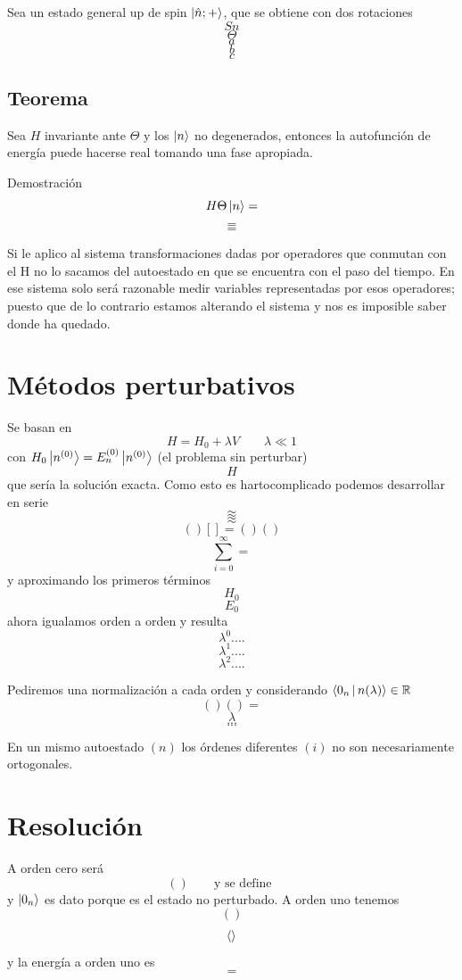 \documentclass[10pt,oneside]{CBFT_book}
\begin{document}
Sea un estado general up de spin $\Ket{\hat{n};+}$, que se obtiene con dos rotaciones 
\[
	Sn
\]
\[
	\Theta
\]
\[
	a
\]
\[
	b
\]
\[
	c
\]

\subsection{Teorema}

Sea $H$ invariante ante $\Theta$ y los $\Ket{n}$ no degenerados, entonces la autofunción de energía puede 
hacerse real tomando una fase apropiada.

Demostración 
\[
	H \Theta  \Ket{n} =
\]
\[
	=
\]
\[
	=
\]

Si le aplico al sistema transformaciones dadas por operadores que conmutan con el H no lo sacamos del 
autoestado en que se encuentra con el paso del tiempo.
En ese sistema solo será razonable medir variables representadas por esos operadores; puesto que de lo 
contrario estamos alterando el sistema y nos es imposible saber donde ha quedado.

\section{Métodos perturbativos}

Se basan en 
\[
	H = H_0 + \lambda V \qquad \lambda \ll 1
\]
con $ H_0\Ket{n^{(0)}} = E_n^{(0)}\Ket{n^{(0)}}$ (el problema sin perturbar)
\[
	H
\]
que sería la solución exacta.
Como esto es hartocomplicado podemos desarrollar en serie 
\[
	\approx 
\]
\[
	\approx 
\]
\[
	()[] = ()()
\]
\[
	\sum_{i=0}^\infty =
\]
y aproximando los primeros términos 
\[
	H_0
\]
\[
	E_0
\]
ahora igualamos orden a orden y resulta 
\[
	\lambda^0 ....
\]
\[
	\lambda^1 ....
\]
\[
	\lambda^2 ....
\]

Pediremos una normalización a cada orden y considerando $ \Braket{0_n|n(\lambda)} \in \mathbb{R}$
\[
	()() =
\]
\[
	\lambda
\]
\[
	...
\]
\[
	...
\]

En un mismo autoestado $(n)$ los órdenes diferentes $(i)$ no son necesariamente ortogonales.

\section{Resolución}

A orden cero será 
\[
	() \qquad \text{y se define} \qquad 
\]
y $\Ket{0_n}$ es dato porque es el estado no perturbado.
A orden uno tenemos 
\[
	()
\]
\[
	\Braket{}
\]
y la energía a orden uno es 
\[
	=
\]
\end{document}
